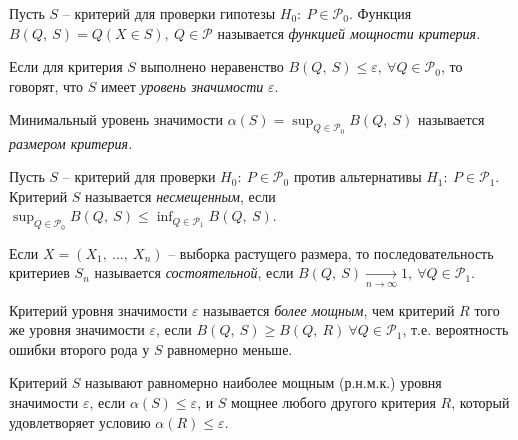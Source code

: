 \begin{definition}
    Пусть $\displaystyle S$ -- критерий для проверки гипотезы $\displaystyle H_{0} :\ P\in \mathcal{P}_{0}$. Функция $\displaystyle B( Q,\ S) =Q( X\in S) ,\ Q\in \mathcal{P}$ называется \textit{функцией мощности критерия}\textit{.}
\end{definition}
\begin{definition}
    Если для критерия $\displaystyle S$ выполнено неравенство $\displaystyle B( Q,\ S) \leqslant \varepsilon ,\ \forall Q\in \mathcal{P}_{0}$, то говорят, что $\displaystyle S$ имеет \textit{уровень значимости}\textit{ }$\displaystyle \varepsilon $.
\end{definition}
\begin{definition}
    Минимальный уровень значимости $\displaystyle \alpha ( S) =\sup _{Q\in \mathcal{P}_{0}} B( Q,\ S)$ называется \textit{размером критерия}\textit{.}
\end{definition}
\begin{definition}
    Пусть $\displaystyle S$ -- критерий для проверки $\displaystyle H_{0} :\ P\in \mathcal{P}_{0}$ против альтернативы $\displaystyle H_{1} :\ P\in \mathcal{P}_{1}$. Критерий $\displaystyle S$ называется \textit{несмещенным}, если $\displaystyle \sup _{Q\in \mathcal{P}_{0}} B( Q,\ S) \leqslant \inf_{Q\in \mathcal{P}_{1}} B( Q,\ S)$.
\end{definition}
\begin{definition}
    Если $\displaystyle X=( X_{1} ,\ \dotsc ,\ X_{n})$ -- выборка растущего размера, то последовательность критериев $\displaystyle S_{n}$ называется \textit{состоятельной}, если $\displaystyle B( Q,\ S)\xrightarrow[n\rightarrow \infty ]{} 1,\ \forall Q\in \mathcal{P}_{1}$.
\end{definition}
\begin{definition}
    Критерий уровня значимости $\displaystyle \varepsilon $ называется \textit{более мощным}, чем критерий $\displaystyle R$ того же уровня значимости $\displaystyle \varepsilon $, если $\displaystyle B( Q,\ S) \geqslant B( Q,\ R) \ \forall Q\in \mathcal{P}_{1}$, т.е. вероятность ошибки второго рода у $\displaystyle S$ равномерно меньше.
\end{definition}
\begin{definition}
    Критерий $\displaystyle S$ называют равномерно наиболее мощным (р.н.м.к.) уровня значимости $\displaystyle \varepsilon $, если $\displaystyle \alpha ( S) \leqslant \varepsilon $, и $\displaystyle S$ мощнее любого другого критерия $\displaystyle R$, который удовлетворяет условию $\displaystyle \alpha ( R) \leqslant \varepsilon $.
\end{definition}

